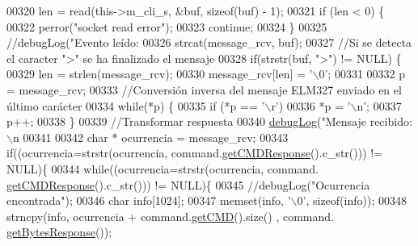 \begin{DoxyCode}
{{{{{{{00320                     len = read(this->m\_cli\_s, &buf, \textcolor{keyword}{sizeof}(buf) - 1);
00321                     \textcolor{keywordflow}{if} (len < 0) \{
00322                         perror(\textcolor{stringliteral}{"socket read error"});
00323                         \textcolor{keywordflow}{continue};
00324                     \}
00325                     \textcolor{comment}{//debugLog("Evento leído: %
00326                     strcat(message\_rcv, buf);
00327                     \textcolor{comment}{//Si se detecta el caracter ">" se ha finalizado el mensaje}
00328                     \textcolor{keywordflow}{if}(strstr(buf, \textcolor{stringliteral}{">"}) != NULL) \{
00329                         len = strlen(message\_rcv);
00330                         message\_rcv[len] = \textcolor{charliteral}{'\(\backslash\)0'};
00331 
00332                         p = message\_rcv;
00333                         \textcolor{comment}{//Conversión inversa del mensaje ELM327 enviado en el último carácter}
00334                         \textcolor{keywordflow}{while}(*p) \{
00335                             \textcolor{keywordflow}{if} (*p == \textcolor{charliteral}{'\(\backslash\)r'})
00336                                 *p = \textcolor{charliteral}{'\(\backslash\)n'};
00337                             p++;
00338                         \}
00339                         \textcolor{comment}{//Transformar respuesta}
00340                         \hyperlink{debug_8hpp_a55f41cf7b0585224496de3d7adbc101c}{debugLog}(\textcolor{stringliteral}{"Mensaje recibido:\(\backslash\)n%
00341 
00342                         \textcolor{keywordtype}{char} * ocurrencia = message\_rcv;
00343                         \textcolor{keywordflow}{if}((ocurrencia=strstr(ocurrencia, command.\hyperlink{classCommands_ab4806a2fda5c80e10ab4446faa1e39b5}{getCMDResponse}().c\_str())) 
      != NULL)\{
00344                             \textcolor{keywordflow}{while}((ocurrencia=strstr(ocurrencia, command.
      \hyperlink{classCommands_ab4806a2fda5c80e10ab4446faa1e39b5}{getCMDResponse}().c\_str())) != NULL)\{
00345                                 \textcolor{comment}{//debugLog("Ocurrencia encontrada");}
00346                                 \textcolor{keywordtype}{char} info[1024];
00347                                 memset(info, \textcolor{charliteral}{'\(\backslash\)0'}, \textcolor{keyword}{sizeof}(info));
00348                                 strncpy(info, ocurrencia + command.\hyperlink{classCommands_a9aee21ab91fdfc8e9daa59e1e8f20b73}{getCMD}().size() , command.
      \hyperlink{classCommands_a9b3d961dbebbd25f141d18cd5a267738}{getBytesResponse}());
}}}}}}}}}
\end{DoxyCode}
